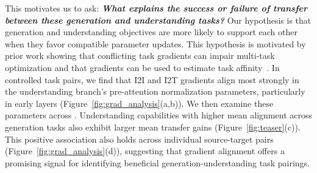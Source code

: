 This motivates us to ask: \textbf{\textit{What explains the success or failure of transfer between these generation and understanding tasks?}} 
Our hypothesis is that generation and understanding objectives are more likely to support each other when they favor compatible parameter updates.
This hypothesis is motivated by prior work showing that conflicting task gradients can impair multi-task optimization and that gradients can be used to estimate task affinity~\citep{yu2020gradient,fifty2021efficient}.
In controlled task pairs, we find that I2I and I2T gradients align most strongly in the understanding branch's pre-attention normalization parameters, particularly in early layers (Figure~\ref{fig:grad_analysis}(a,b)).
We then examine these parameters across \methodname. Understanding capabilities with higher mean alignment across generation tasks also exhibit larger mean transfer gains (Figure~\ref{fig:teaser}(c)). 
This positive association also holds across individual source-target pairs (Figure~\ref{fig:grad_analysis}(d)), suggesting that gradient alignment offers a promising signal for identifying beneficial generation-understanding task pairings.


